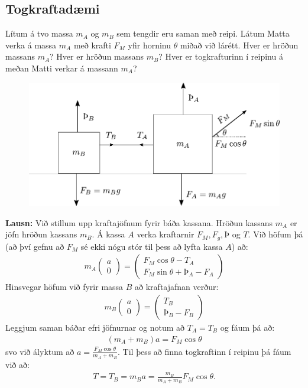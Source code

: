 \ifdefined \wholebook \else\documentclass[oneside]{book}\usepackage{EdlBook}\graphicspath{{figures/}}
\begin{document}
\subsection*{Togkraftadæmi}

Lítum á tvo massa $m_A$ og $m_B$ sem tengdir eru saman með reipi. Látum Matta verka á massa $m_A$ með krafti $F_M$ yfir horninu $\theta$ miðað við lárétt. Hver er hröðun massans $m_A$? Hver er hröðun massans $m_B$? Hver er togkrafturinn í reipinu á meðan Matti verkar á massann $m_A$?

\begin{figure}[H]
    \centering
    \includegraphics[scale = 0.7]{figures/ytakubb.pdf}
\end{figure}

\textbf{Lausn:} Við stillum upp kraftajöfnum fyrir báða kassana. Hröðun kassans $m_A$ er jöfn hröðun kassans $m_B$. Á kassa $A$ verka kraftarnir $F_M, F_g, Þ$ og $T$. Við höfum þá (að því gefnu að $F_M$ sé ekki nógu stór til þess að lyfta kassa $A$) að:
\begin{align*}
    m_A\begin{pmatrix}
    a \\
    0
    \end{pmatrix} = \begin{pmatrix}
    F_M \cos\theta - T_A \\
    F_M\sin\theta + Þ_A - F_A
    \end{pmatrix}
\end{align*}
Hinsvegar höfum við fyrir massa $B$ að kraftajafnan verður:
\begin{align*}
   m_B \begin{pmatrix}
a \\ 0
\end{pmatrix} = \begin{pmatrix}
T_B \\ Þ_B - F_B
\end{pmatrix} 
\end{align*}
Leggjum saman báðar efri jöfnurnar og notum að $T_A = T_B$ og fáum þá að:
\begin{align*}
    \left(m_A + m_B \right)a = F_M \cos\theta
\end{align*}
svo við ályktum að $a = \frac{F_M \cos\theta}{m_A + m_B}$. Til þess að finna togkraftinn í reipinu þá fáum við að:
\begin{align*}
    T = T_B = m_Ba = \frac{m_B}{m_A + m_B}F_M \cos\theta.
\end{align*}
\end{document}
